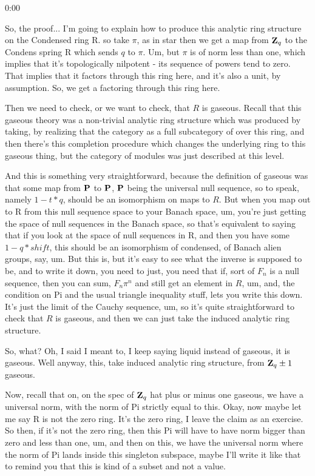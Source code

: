 \begin{unfinished}{0:00}
{So, the proof... I'm going to explain how to produce this analytic ring structure on the Condensed ring R. so take $\pi$, as in star then we get a map from $\Z_q$ to the Condens spring R which sends $q$ to $\pi$. Um, but $\pi$ is of norm less than one, which implies that it's topologically nilpotent - its sequence of powers tend to zero. That implies that it factors through this ring here, and it's also a unit, by assumption. So, we get a factoring through this ring here.

Then we need to check, or we want to check, that $R$ is gaseous. Recall that this gaseous theory was a non-trivial analytic ring structure which was produced by taking, by realizing that the category as a full subcategory of over this ring, and then there's this completion procedure which changes the underlying ring to this gaseous thing, but the category of modules was just described at this level.

And this is something very straightforward, because the definition of gaseous was that some map from $\P$ to $\P$, $\P$ being the universal null sequence, so to speak, namely $1 - t * q$, should be an isomorphism on maps to $R$. But when you map out to R from this null sequence space to your Banach space, um, you're just getting the space of null sequences in the Banach space, so that's equivalent to saying that if you look at the space of null sequences in R, and then you have some $1 - q * shift$, this should be an isomorphism of condensed, of Banach alien groups, say, um. But this is, but it's easy to see what the inverse is supposed to be, and to write it down, you need to just, you need that if, sort of $F_n$ is a null sequence, then you can sum, $F_n \pi^n$ and still get an element in $R$, um, and, the condition on Pi and the usual triangle inequality stuff, lets you write this down. It's just the limit of the Cauchy sequence, um, so it's quite straightforward to check that $R$ is gaseous, and then we can just take the induced analytic ring structure.

So, what? Oh, I said I meant to, I keep saying liquid instead of gaseous, it is gaseous. Well anyway, this, take induced analytic ring structure, from $\Z_q \pm 1$ gaseous.

Now, recall that on, on the spec of $\Z_q$ hat plus or minus one gaseous, we have a universal norm, with the norm of Pi strictly equal to this. Okay, now maybe let me say R is not the zero ring. It's the zero ring, I leave the claim as an exercise. So then, if it's not the zero ring, then this Pi will have to have norm bigger than zero and less than one, um, and then on this, we have the universal norm where the norm of Pi lands inside this singleton subspace, maybe I'll write it like that to remind you that this is kind of a subset and not a value.

}
\end{unfinished}

